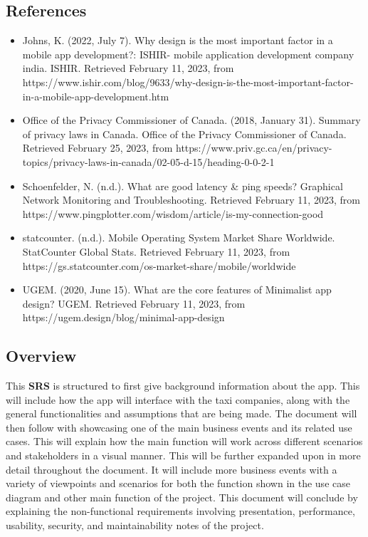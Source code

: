 \documentclass[]{article}
\begin{document}
\subsection{References}
\label{sub:references}
\begin{itemize}
	\item Johns, K. (2022, July 7). Why design is the most important factor in a mobile app development?: ISHIR- mobile application development company india. ISHIR. Retrieved February 11, 2023, from https://www.ishir.com/blog/9633/why-design-is-the-most-important-factor-in-a-mobile-app-development.htm 
	\item Office of the Privacy Commissioner of Canada. (2018, January 31). Summary of privacy laws in Canada. Office of the Privacy Commissioner of Canada. Retrieved February 25, 2023, from https://www.priv.gc.ca/en/privacy-topics/privacy-laws-in-canada/02-05-d-15/heading-0-0-2-1
	\item Schoenfelder, N. (n.d.). What are good latency \& ping speeds? Graphical Network Monitoring and Troubleshooting. Retrieved February 11, 2023, from https://www.pingplotter.com/wisdom/article/is-my-connection-good 
	\item statcounter. (n.d.). Mobile Operating System Market Share Worldwide. StatCounter Global Stats. Retrieved February 11, 2023, from https://gs.statcounter.com/os-market-share/mobile/worldwide 
	\item UGEM. (2020, June 15). What are the core features of Minimalist app design? UGEM. Retrieved February 11, 2023, from https://ugem.design/blog/minimal-app-design 
\end{itemize}

\subsection{Overview}
\label{sub:overview}
This \textbf{SRS} is structured to first give background information about the app. This will include how the app will interface with the taxi companies, along with the general functionalities and assumptions that are being made. The document will then follow with showcasing one of the main business events and its related use cases. This will explain how the main function will work across different scenarios and stakeholders in a visual manner. This will be further expanded upon in more detail throughout the document. It will include more business events with a variety of viewpoints and scenarios for both the function shown in the use case diagram and other main function of the project. This document will conclude by explaining the non-functional requirements involving presentation, performance, usability, security, and maintainability notes of the project.
\end{document}
